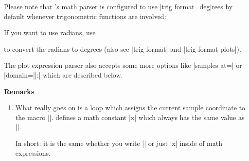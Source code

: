 {\begin{addplotoperation}[]{}{}
    Please note that \PGF's math parser is configured to use
    |trig format=deg|rees by default whenever trigonometric functions are
    involved:
\begin{codeexample}[]
\end{codeexample}
    \noindent If you want to use radians, use
\begin{codeexample}[]
\end{codeexample}
    \noindent to convert the radians to degrees (also see |trig format| and
    |trig format plots|).

    The plot expression parser also accepts some more options like
    |samples at=| or |domain=||:|
    which are described below.


    \textbf{Remarks}

    \begin{enumerate}
        \item What really goes on is a loop which assigns the current sample
            coordinate to the macro |\x|. \PGFPlots{} defines a math constant
            |x| which always has the same value as |\x|.

            In short: it is the same whether you write |\x| or just |x| inside
            of math expressions.


\end{enumerate}
\end{addplotoperation}}
